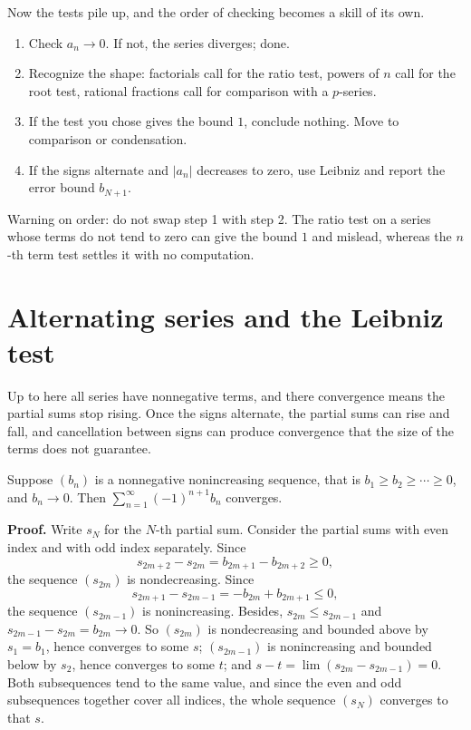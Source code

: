 Now the tests pile up, and the order of checking becomes a skill of its own.

\begin{resep}
\begin{enumerate}
\item Check $a_n \to 0$. If not, the series diverges; done.
\item Recognize the shape: factorials call for the ratio test, powers of $n$ call for the
      root test, rational fractions call for comparison with a $p$-series.
\item If the test you chose gives the bound $1$, conclude nothing. Move to comparison or
      condensation.
\item If the signs alternate and $|a_n|$ decreases to zero, use Leibniz and report the
      error bound $b_{N+1}$.
\end{enumerate}

Warning on order: do not swap step 1 with step 2. The ratio test on a series whose terms do
not tend to zero can give the bound $1$ and mislead, whereas the $n$-th term test settles
it with no computation.
\end{resep}

\section{Alternating series and the Leibniz test}

Up to here all series have nonnegative terms, and there convergence means the partial sums
stop rising. Once the signs alternate, the partial sums can rise and fall, and cancellation
between signs can produce convergence that the size of the terms does not guarantee.

\begin{teorema}
Suppose $(b_n)$ is a nonnegative nonincreasing sequence, that is
$b_1 \ge b_2 \ge \cdots \ge 0$, and $b_n \to 0$. Then
$\sum_{n=1}^{\infty} (-1)^{n+1} b_n$ converges.
\end{teorema}

\noindent\textbf{Proof.} Write $s_N$ for the $N$-th partial sum. Consider the partial sums
with even index and with odd index separately. Since
\[
  s_{2m+2} - s_{2m} = b_{2m+1} - b_{2m+2} \ge 0,
\]
the sequence $(s_{2m})$ is nondecreasing. Since
\[
  s_{2m+1} - s_{2m-1} = -b_{2m} + b_{2m+1} \le 0,
\]
the sequence $(s_{2m-1})$ is nonincreasing. Besides, $s_{2m} \le s_{2m-1}$ and
$s_{2m-1} - s_{2m} = b_{2m} \to 0$. So $(s_{2m})$ is nondecreasing and bounded above by
$s_1 = b_1$, hence converges to some $s$; $(s_{2m-1})$ is nonincreasing and bounded below
by $s_2$, hence converges to some $t$; and $s - t = \lim (s_{2m} - s_{2m-1}) = 0$. Both
subsequences tend to the same value, and since the even and odd subsequences together cover
all indices, the whole sequence $(s_N)$ converges to that $s$.

